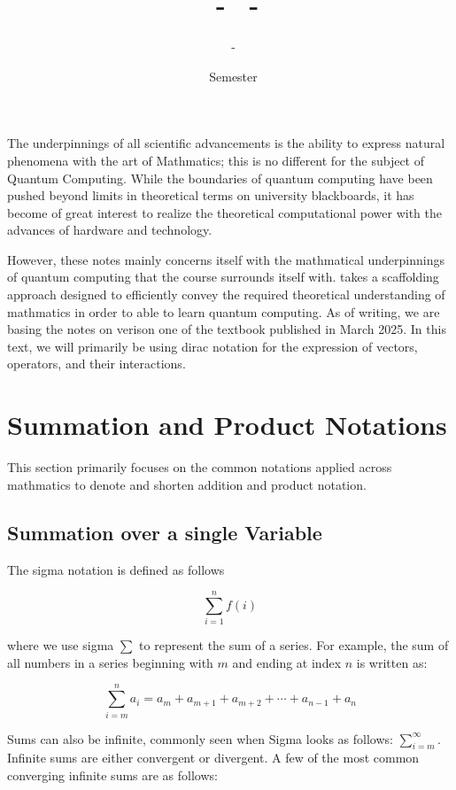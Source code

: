 \documentclass[12pt]{article}
\title{\COURSECODE\ - \FULLCOURSENAME\ - \UNIVERSITY}
\author{\PROFESSORNAME\ - \STUDENTNAME}
\date{\SEMESTER\ Semester \YEAR}
\theoremstyle{definition}
\begin{document}
\maketitle

\hfill

The underpinnings of all scientific advancements is the ability to express natural phenomena with the art of Mathmatics; this is no different for the subject of Quantum Computing. While the boundaries of quantum computing have been pushed beyond limits in theoretical terms on university blackboards, it has become of great interest to realize the theoretical computational power with the advances of hardware and technology. 

However, these notes mainly concerns itself with the mathmatical underpinnings of quantum computing that the course surrounds itself with. \FULLCOURSENAME takes a scaffolding approach designed to efficiently convey the required theoretical understanding of mathmatics in order to able to learn quantum computing. As of writing, we are basing the notes on verison one of the textbook published in March 2025. In this text, we will primarily be using dirac notation for the expression of vectors, operators, and their interactions. 

\tableofcontents

\break


\section{Summation and Product Notations}

This section primarily focuses on the common notations applied across mathmatics to denote and shorten addition and product notation. 

\subsection{Summation over a single Variable}

The sigma notation is defined as follows

$$\sum_{i=1}^{n}f(i)$$

where we use sigma $\sum$ to represent the sum of a series. For example, the sum of all numbers in a series beginning with $m$ and ending at index $n$ is written as:

$$\sum_{i=m}^{n} a_i = a_m + a_{m+1} + a_{m+2} + \cdots + a_{n-1} + a_n$$

Sums can also be infinite, commonly seen when Sigma looks as follows: $\sum^{\infty}_{i=m}$. Infinite sums are either convergent or divergent. A few of the most common converging infinite sums are as follows:
\end{document}
